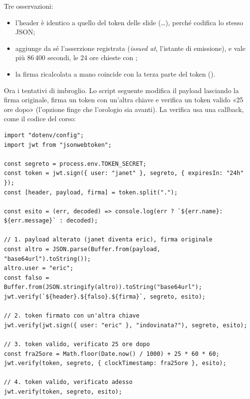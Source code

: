 
Tre osservazioni:

\begin{itemize}
  \item l'header è identico a quello del token delle slide
        (\ldots{}), perché codifica lo stesso
        JSON;
  \item {} aggiunge da sé l'asserzione registrata 
        (\textit{issued at}, l'istante di emissione), e  vale
         più 86\,400 secondi, le 24 ore chieste con
        ;
  \item la firma ricalcolata a mano coincide con la terza parte del token
        ().
\end{itemize}

Ora i tentativi di imbroglio. Lo script seguente modifica il payload lasciando
la firma originale, firma un token con un'altra chiave e verifica un token
valido «25 ore dopo» (l'opzione  finge che l'orologio sia
avanti). La verifica usa una callback, come il codice del corso:

\begin{lstlisting}[style=js, name=attacchi.js]
import "dotenv/config";
import jwt from "jsonwebtoken";

const segreto = process.env.TOKEN_SECRET;
const token = jwt.sign({ user: "janet" }, segreto, { expiresIn: "24h" });
const [header, payload, firma] = token.split(".");

const esito = (err, decoded) => console.log(err ? `${err.name}: ${err.message}` : decoded);

// 1. payload alterato (janet diventa eric), firma originale
const altro = JSON.parse(Buffer.from(payload, "base64url").toString());
altro.user = "eric";
const falso = Buffer.from(JSON.stringify(altro)).toString("base64url");
jwt.verify(`${header}.${falso}.${firma}`, segreto, esito);

// 2. token firmato con un'altra chiave
jwt.verify(jwt.sign({ user: "eric" }, "indovinata?"), segreto, esito);

// 3. token valido, verificato 25 ore dopo
const fra25ore = Math.floor(Date.now() / 1000) + 25 * 60 * 60;
jwt.verify(token, segreto, { clockTimestamp: fra25ore }, esito);

// 4. token valido, verificato adesso
jwt.verify(token, segreto, esito);
\end{lstlisting}

